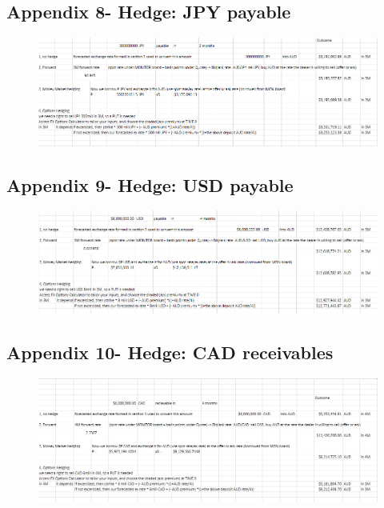 \documentclass{article}
\let\Oldsubsection\subsection
\renewcommand{\subsection}{\FloatBarrier\Oldsubsection}
\begin{document}
\subsection*{Appendix 8- Hedge: JPY payable}

\begin{figure}[h!]
    \centering
    \includegraphics[scale=0.5]{hedge/pay-JPY.png}
\end{figure}

\subsection*{Appendix 9- Hedge: USD payable}

\begin{figure}[h!]
    \centering
    \includegraphics[scale=0.5]{hedge/pay-USD.png}
\end{figure}

\subsection*{Appendix 10- Hedge: CAD receivables}

\begin{figure}[h!]
    \centering
    \includegraphics[scale=0.5]{hedge/rec-CAD.png}
\end{figure}
\end{document}
